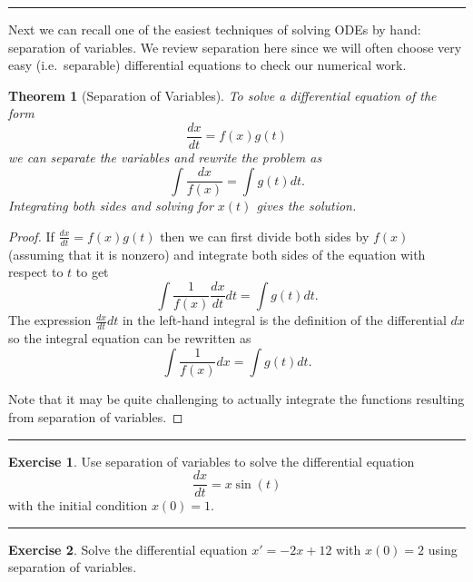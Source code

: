\documentclass[
]{book}
\newtheorem{theorem}{Theorem}[chapter]
\theoremstyle{definition}
\theoremstyle{definition}
\theoremstyle{definition}
\newtheorem{exercise}{Exercise}[chapter]
\theoremstyle{remark}
\begin{document}
\begin{center}\rule{0.5\linewidth}{0.5pt}\end{center}

Next we can recall one of the easiest techniques of solving ODEs by hand: separation of variables. We review separation here since we will often choose very easy (i.e.~separable) differential equations to check our numerical work.

\begin{theorem}[Separation of Variables]
\protect\hypertarget{thm:unnamed-chunk-418}{}{\label{thm:unnamed-chunk-418} {} }To solve a differential equation of the form
\[\frac{dx}{dt} = f(x) g(t)\] we can separate the variables and rewrite
the problem as \[\int \frac{dx}{f(x)} = \int g(t) dt.\] Integrating both
sides and solving for \(x(t)\) gives the solution.
\end{theorem}

\begin{proof}
{}If \(\frac{dx}{dt} = f(x) g(t)\) then we can first divide both sides by \(f(x)\) (assuming that it is nonzero) and integrate both sides of the equation with respect to \(t\) to get\\
\[ \int \frac{1}{f(x)} \frac{dx}{dt} dt = \int g(t) dt. \]
The expression \(\frac{dx}{dt} dt\) in the left-hand integral is the definition of the differential \(dx\) so the integral equation can be rewritten as
\[ \int \frac{1}{f(x)} dx = \int g(t) dt. \]

Note that it may be quite challenging to actually integrate the functions resulting from separation of variables.
\end{proof}

\begin{center}\rule{0.5\linewidth}{0.5pt}\end{center}

\begin{exercise}
\protect\hypertarget{exr:unnamed-chunk-420}{}{\label{exr:unnamed-chunk-420} }Use separation of variables to solve the differential equation \[\frac{dx}{dt} = x\sin(t)\] with the initial condition \(x(0) = 1\).
\end{exercise}

\begin{center}\rule{0.5\linewidth}{0.5pt}\end{center}

\begin{exercise}
\protect\hypertarget{exr:unnamed-chunk-421}{}{\label{exr:unnamed-chunk-421} }Solve the differential equation \(x' = -2x + 12\) with \(x(0) = 2\) using separation of variables.
\end{exercise}
\end{document}
